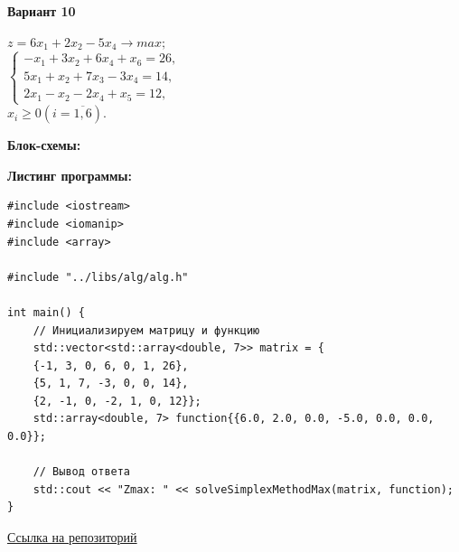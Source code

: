 \documentclass[a4paper,14pt]{extarticle}
\begin{document}
\begin{center}
    \textbf{Вариант 10}
\end{center}
\begin{center}
    $z = 6 x_1 + 2x_2 -5x_4 \rightarrow max;$\\
    $\begin{cases}
        -x_1 + 3x_2 + 6x_4 + x_6 = 26, \\
        5x_1 + x_2 + 7x_3 -3x_4 = 14,  \\
        2x_1 - x_2 - 2x_4 + x_5 = 12,
    \end{cases}$\\
    $x_i \ge 0 (i = \overline{1, 6})$.
\end{center}

\textbf{Блок-схемы: }
\begin{center}
    \bigbreak
    \bigbreak
    \bigbreak
    
\end{center}

\textbf{Листинг программы: }
\begin{verbatim}
#include <iostream>
#include <iomanip>
#include <array>

#include "../libs/alg/alg.h"

int main() {
    // Инициализируем матрицу и функцию
    std::vector<std::array<double, 7>> matrix = {
    {-1, 3, 0, 6, 0, 1, 26},
    {5, 1, 7, -3, 0, 0, 14},
    {2, -1, 0, -2, 1, 0, 12}};
    std::array<double, 7> function{{6.0, 2.0, 0.0, -5.0, 0.0, 0.0, 0.0}};

    // Вывод ответа
    std::cout << "Zmax: " << solveSimplexMethodMax(matrix, function);
}
    \end{verbatim}
\href{https://github.com/IAmProgrammist/operations_research/blob/master/src/lab2/main.cpp}{Ссылка на репозиторий}\\
\end{document}
